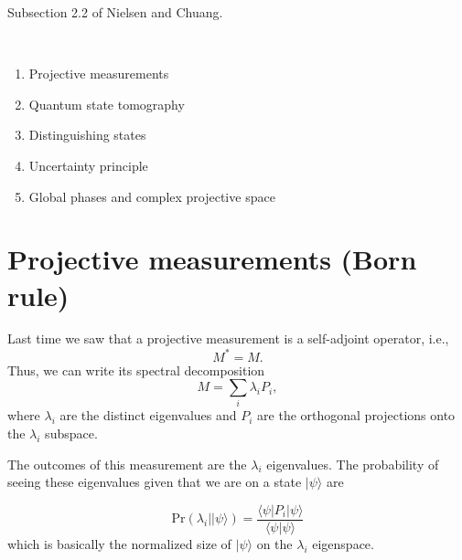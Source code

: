 \documentclass{article}
\newcommand{\ket}[1]{|#1\rangle}
\newcommand{\braket}[2]{\langle#1|#2\rangle}
\begin{document}
\noindent
{}

\vspace{.3cm}

 Subsection 2.2 of Nielsen and Chuang. 

\

\begin{enumerate}
     \item Projective measurements
     \item Quantum state tomography
     \item Distinguishing states
     \item Uncertainty principle
     \item Global phases and complex projective space
\end{enumerate}

\section{Projective measurements (Born rule)}
Last time we saw that a projective measurement is a self-adjoint 
operator, i.e., $$ M^* = M.$$ Thus, we can write
its spectral decomposition $$M = \sum_i \lambda_i P_i,$$
where $\lambda_i$ are the distinct eigenvalues and $P_i$ are 
the orthogonal projections onto the $\lambda_i$ subspace. 

The outcomes of this
measurement are the $\lambda_i$ eigenvalues. The probability
of seeing these eigenvalues given that we are on a state $\ket \psi$ are

\begin{equation}
     \label{eq:proj-prob}
     \mathrm{Pr} (\lambda_i | \ket{\psi})  = 
                                             \frac{\braket{\psi | P_i}{\psi}}
                                                  {\braket{\psi}{\psi}}
\end{equation}
which is basically the normalized size of $\ket \psi$ on the $\lambda_i$ eigenspace.
\end{document}
